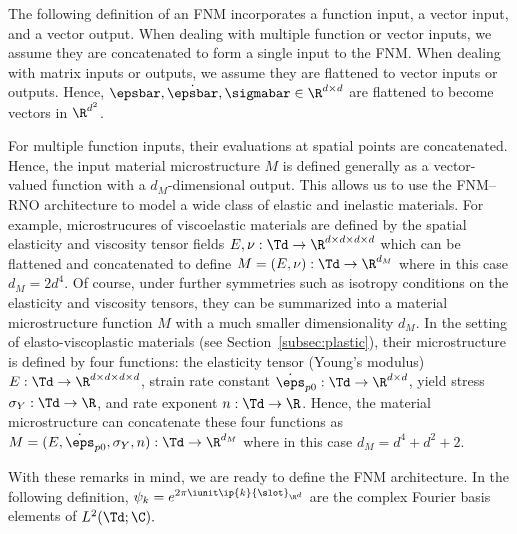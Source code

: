 \documentclass[letterpaper,11pt]{article}
\begin{document}
\begin{remark}\label{rem:dims}
    The following definition of an FNM incorporates a function input, a vector input, and a vector output. When dealing with multiple function or vector inputs, we assume they are concatenated to form a single input to the FNM. When dealing with matrix inputs or outputs, we assume they are flattened to vector inputs or outputs. Hence, $\epsbar, \dot{\epsbar}, \sigmabar \in \R^{d \times d}$ are flattened to become vectors in $\R^{d^2}$.

    For multiple function inputs, their evaluations at spatial points are concatenated. Hence, the input material microstructure $M$ is defined generally as a vector-valued function with a $d_M$-dimensional output. This allows us to use the FNM--RNO architecture to model a wide class of elastic and inelastic materials. For example, microstrucures of viscoelastic materials are defined by the spatial elasticity and viscosity tensor fields $E, \nu: \Td \to \R^{d \times d \times d \times d}$ which can be flattened and concatenated to define $M = (E, \nu): \Td \to \R^{d_M}$ where in this case $d_M = 2d^4$. Of course, under further symmetries such as isotropy conditions on the elasticity and viscosity tensors, they can be summarized into a material microstructure function $M$ with a much smaller dimensionality $d_M$. In the setting of elasto-viscoplastic materials (see Section~\ref{subsec:plastic}), their microstructure is defined by four functions: the elasticity tensor (Young's modulus) $E: \Td \to \R^{d \times d \times d \times d}$, strain rate constant $\dot{\eps}_{p0}: \Td \to \R^{d \times d}$, yield stress $\sigma_Y: \Td \to \R$, and rate exponent $n: \Td \to \R$. Hence, the material microstructure can concatenate these four functions as $M = (E, \dot{\eps}_{p0}, \sigma_Y, n): \Td \to \R^{d_M}$ where in this case $d_M = d^4 + d^2 + 2$.
\end{remark}

With these remarks in mind, we are ready to define the FNM architecture.
In the following definition, $\psi_k = e^{2\pi \iunit \ip{k}{\slot}_{\R^d}}$ are the complex Fourier basis elements of $L^2(\Td;\C).$
\end{document}
